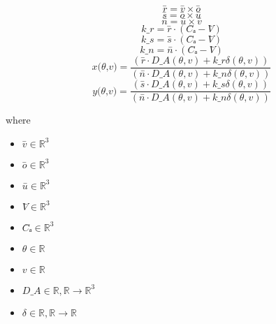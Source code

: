 \documentclass[12pt]{article}
\begin{document}
\[
\textit{r̄} = \textit{v̄} × \textit{ō}
\]
\[
\textit{s̄} = \textit{ō} × \textit{ū}
\]
\[
\textit{n̄} = \textit{ū} × \textit{v̄}
\]
\[
\textit{k\_r} = \textit{r̄} \cdot (\textit{C̄ₐ} - \textit{V̄})
\]
\[
\textit{k\_s} = \textit{s̄} \cdot (\textit{C̄ₐ} - \textit{V̄})
\]
\[
\textit{k\_n} = \textit{n̄} \cdot (\textit{C̄ₐ} - \textit{V̄})
\]
\[
\textit{x(θ,v)} = \frac{(\textit{r̄} \cdot \textit{D\_A}(\textit{θ},\textit{v}) + \textit{k\_r}\textit{δ}(\textit{θ},\textit{v}))}{(\textit{n̄} \cdot \textit{D\_A}(\textit{θ},\textit{v}) + \textit{k\_n}\textit{δ}(\textit{θ},\textit{v}))}
\]
\[
\textit{y(θ,v)} = \frac{(\textit{s̄} \cdot \textit{D\_A}(\textit{θ},\textit{v}) + \textit{k\_s}\textit{δ}(\textit{θ},\textit{v}))}{(\textit{n̄} \cdot \textit{D\_A}(\textit{θ},\textit{v}) + \textit{k\_n}\textit{δ}(\textit{θ},\textit{v}))}
\]

where
\begin{itemize}
\item $\textit{v̄} \in \mathbb{R}^{ 3}$
\item $\textit{ō} \in \mathbb{R}^{ 3}$
\item $\textit{ū} \in \mathbb{R}^{ 3}$
\item $\textit{V̄} \in \mathbb{R}^{ 3}$
\item $\textit{C̄ₐ} \in \mathbb{R}^{ 3}$
\item $\textit{θ} \in \mathbb{{R}}$
\item $\textit{v} \in \mathbb{{R}}$
\item $\textit{D\_A} \in \mathbb{{R}},\mathbb{{R}}\rightarrow \mathbb{R}^{ 3}$
\item $\textit{δ} \in \mathbb{{R}},\mathbb{{R}}\rightarrow \mathbb{{R}}$
\end{itemize}
\end{document}
